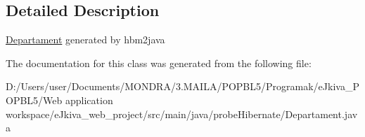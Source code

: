 \subsection{Detailed Description}
\mbox{\hyperlink{classprobe_hibernate_1_1_departament}{Departament}} generated by hbm2java 

The documentation for this class was generated from the following file\+:\begin{DoxyCompactItemize}
\item 
D\+:/\+Users/user/\+Documents/\+M\+O\+N\+D\+R\+A/3.\+M\+A\+I\+L\+A/\+P\+O\+P\+B\+L5/\+Programak/e\+Jkiva\+\_\+\+P\+O\+P\+B\+L5/\+Web application workspace/e\+Jkiva\+\_\+web\+\_\+project/src/main/java/probe\+Hibernate/Departament.\+java\end{DoxyCompactItemize}
